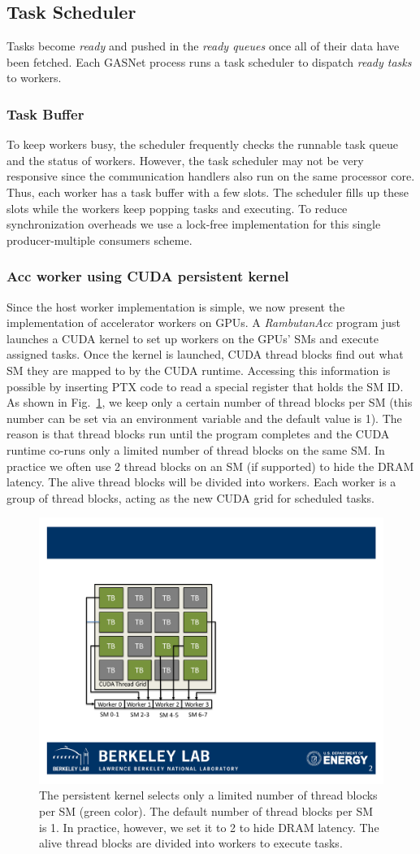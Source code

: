 \subsection{Task Scheduler}
Tasks become {\em ready} and pushed in the {\em ready queues} once all of their data have been fetched.
Each GASNet process runs a task scheduler to dispatch {\em ready tasks} to workers. 

\subsubsection{Task Buffer}
To keep workers busy, the scheduler frequently checks the runnable task queue and the status of workers.
However, the task scheduler may not be very responsive since the communication handlers also run on the same processor core.
Thus, each worker has a task buffer with a few slots.
The scheduler fills up these slots while the workers keep popping tasks and executing.
To reduce synchronization overheads we use a lock-free implementation for this single producer-multiple consumers scheme.

\subsubsection{Acc worker using CUDA persistent kernel}
Since the host worker implementation is simple, we now present the implementation of accelerator workers on GPUs.
A {\em RambutanAcc} program just launches a CUDA kernel to set up workers on the GPUs' SMs and execute assigned tasks.
Once the kernel is launched, CUDA thread blocks find out what SM they are mapped to by the CUDA runtime.
Accessing this information is possible by inserting PTX code to read a special register that holds the SM ID.
As shown in Fig.~\ref{fig:kernel}, we keep only a certain number of thread blocks per SM (this number can be set via an environment variable and the default value is 1).
The reason is that thread blocks run until the program completes and the CUDA runtime co-runs only a limited number of thread blocks on the same SM.
In practice we often use 2 thread blocks on an SM (if supported) to hide the DRAM latency.
The alive thread blocks will be divided into workers.
Each worker is a group of thread blocks, acting as the new CUDA grid for scheduled tasks.

\begin{figure}[htb]
\centering
\includegraphics[width=.35\textwidth]{figures/kernel_init.pdf}
\caption{The persistent kernel selects only a limited number of thread blocks per SM (green color). The default number of thread blocks per SM is 1. 
In practice, however, we set it to 2 to hide DRAM latency.
The alive thread blocks are divided into workers to execute tasks.}
\label{fig:kernel}
\end{figure}

